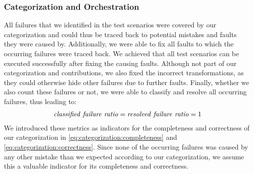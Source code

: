 

\subsubsection{Categorization and Orchestration}

All failures that we identified in the test scenarios were covered by our categorization and could thus be traced back to potential mistakes and faults they were caused by.
Additionally, we were able to fix all faults to which the occurring failures were traced back.
We achieved that all test scenarios can be executed successfully after fixing the causing faults.
Although not part of our categorization and contributions, we also fixed the incorrect transformations, as they could otherwise hide other failures due to further faults.
Finally, whether we also count these failures or not, we were able to classify and resolve all occurring failures, thus leading to:
\begin{align*}
    \mathvariable{classified\ failure\ ratio} = \mathvariable{resolved\ failure\ ratio}= 1
\end{align*}
We introduced these metrics as indicators for the completeness and correctness of our categorization in \autoref{eq:categorization:completeness} and \autoref{eq:categorization:correctness}.
Since none of the occurring failures was caused by any other mistake than we expected according to our categorization, we assume this a valuable indicator for its completeness and correctness.


